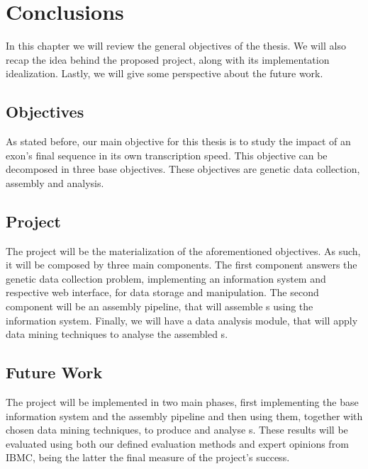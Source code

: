 \chapter{Conclusions}\label{chap:conclusions}

In this chapter we will review the general objectives of the thesis. We will
also recap the idea behind the proposed project, along with its implementation
idealization. Lastly, we will give some perspective about the future work.

\section{Objectives}

As stated before, our main objective for this thesis is to study the impact of
an exon's final sequence in its own transcription speed. This objective can be
decomposed in three base objectives. These objectives are genetic data
collection, \trans{} assembly and \trans{} analysis.

\section{Project}

The project will be the materialization of the aforementioned objectives. As
such, it will be composed by three main components. The first component answers
the genetic data collection problem, implementing an information system and
respective web interface, for data storage and manipulation. The second
component will be an assembly pipeline, that will assemble \trans s using the
information system. Finally, we will have a data analysis module, that will
apply data mining techniques to analyse the assembled \trans s.

\section{Future Work}

The project will be implemented in two main phases, first implementing the base
information system and the assembly pipeline and then using them, together with
chosen data mining techniques, to produce and analyse \trans s. These results
will be evaluated using both our defined evaluation methods and expert opinions
from IBMC, being the latter the final measure of the project's success.
